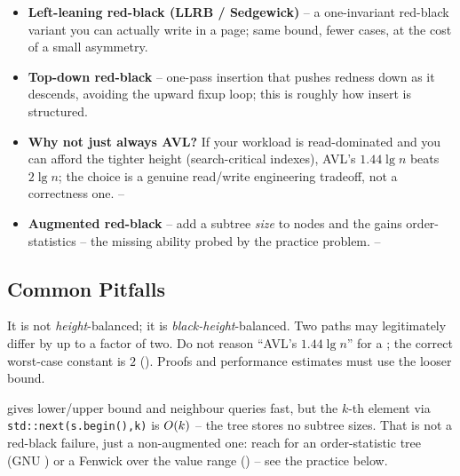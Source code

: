\begin{itemize}[nosep, leftmargin=1.4em]
  \item \textbf{Left-leaning red-black (LLRB / Sedgewick)} -- a one-invariant red-black variant you can
        actually write in a page; same bound, fewer cases, at the cost of a small asymmetry. \hfill{}
  \item \textbf{Top-down red-black} -- one-pass insertion that pushes redness down as it descends, avoiding
        the upward fixup loop; this is roughly how  insert is structured. \hfill{}
  \item \textbf{Why not just always AVL?} If your workload is read-dominated and you can afford the tighter
        height (search-critical indexes), AVL's $1.44\lg n$ beats $2\lg n$; the choice is a genuine
        read/write engineering tradeoff, not a correctness one. \hfill{}--
  \item \textbf{Augmented red-black} -- add a subtree \emph{size} to nodes and the  gains
        order-statistics -- the missing ability probed by the practice problem. \hfill{}--
\end{itemize}

\subsection{Common Pitfalls}\label{sec:c06-redblack-pitfalls}

\begin{warningbox}
It is not \emph{height}-balanced; it is \emph{black-height}-balanced. Two paths may legitimately differ by
up to a factor of two. Do not reason ``AVL's $1.44\lg n$'' for a ; the correct worst-case constant
is $2$ (). Proofs and performance estimates must use the looser bound.
\end{warningbox}

\begin{warningbox}
 gives lower/upper bound and neighbour queries fast, but the $k$-th element via
\texttt{std::next(s.begin(),k)} is $O(k)$ -- the tree stores no subtree sizes. That is not a red-black
failure, just a non-augmented one: reach for an order-statistic tree (GNU ) or a Fenwick over
the value range () -- see the practice below.
\end{warningbox}

